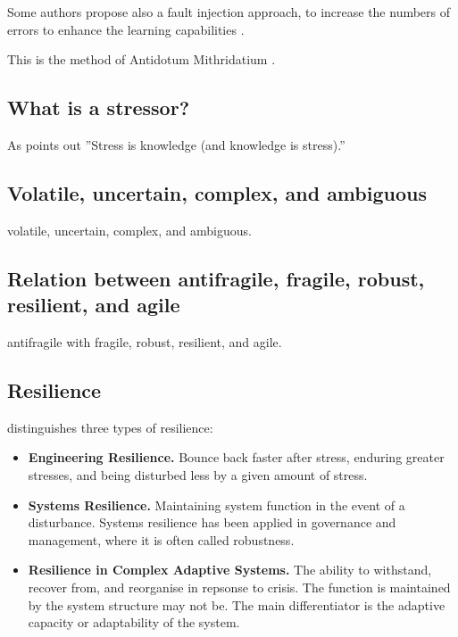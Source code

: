 Some authors propose also a fault injection approach, to increase the numbers of errors to enhance the
learning capabilities \parencite{Russo2017}.
\begin{remark}
	This is the method of Antidotum Mithridatium \parencite{Taleb2012}.
\end{remark}

\subsection{What is a stressor?}
\label{sub:stressor}
As \textcite[p. 54]{Taleb2012} points out ''Stress is knowledge (and knowledge is stress).''

\subsection{Volatile, uncertain, complex, and ambiguous}
\label{seb:tbvuca}

\Gls{volatile}, \gls{uncertain}, \gls{complex}, and \gls{ambiguous}.

\subsection{Relation between antifragile, fragile, robust, resilient, and agile}
\label{sub:tbrelatedtoantifragile}

\gls{antifragile} with \gls{fragile}, \gls{robust}, \gls{resilient}, and \gls{agile}.

\subsection{Resilience}
\label{sub:tbresilience}
\textcite[p. 5-7]{MartinBreen2011} distinguishes three types of resilience:
\begin{itemize}
	\item{\textbf{Engineering Resilience.} Bounce back faster after stress, enduring greater stresses, and being disturbed less by a given amount of stress.}
	\item{\textbf{Systems Resilience.} Maintaining system function in the event of a disturbance. Systems resilience has been applied in governance and management, where it is often called robustness.}
	\item{\textbf{Resilience in Complex Adaptive Systems.} The ability to withstand, recover from, and reorganise in repsonse to crisis. The function is maintained by the system structure may not be. The main differentiator is the adaptive capacity or adaptability of the system.}
\end{itemize}

